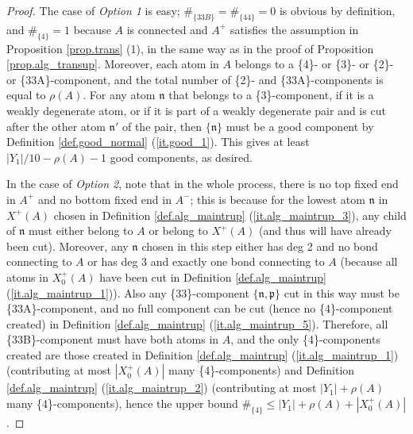 \documentclass[10pt, reqno]{amsart}
\newcommand{\pf}{\mathfrak p}
\newcommand{\nf}{\mathfrak n}
\theoremstyle{definition}
\theoremstyle{remark}
\numberwithin{equation}{section}
\begin{document}
\begin{proof} The case of \emph{Option 1} is easy; $\#_{\{33B\}}=\#_{\{44\}}=0$ is obvious by definition, and $\#_{\{4\}}=1$ because $A$ is connected and $A^+$ satisfies the assumption in Proposition \ref{prop.trans} (1), in the same way as in the proof of Proposition \ref{prop.alg_transup}. Moreover, each atom in $A$ belongs to a \{4\}- or \{3\}- or \{2\}- or \{33A\}-component, and the total number of \{2\}- and \{33A\}-components is equal to $\rho(A)$. For any atom $\nf$ that belongs to a  \{3\}-component, if it is a weakly degenerate atom, or if it is part of a weakly degenerate pair and is cut after the other atom $\nf'$ of the pair, then $\{\nf\}$ must be a good component by Definition \ref{def.good_normal} (\ref{it.good_1}). This gives at least $|Y_1|/10-\rho(A)-1$ good components, as desired.

In the case of \emph{Option 2}, note that in the whole process, there is no top fixed end in $A^+$ and no bottom fixed end in $A^-$; this is because for the lowest atom $\nf$ in $X^+(A)$ chosen in Definition \ref{def.alg_maintrup} (\ref{it.alg_maintrup_3}), any child of $\nf$ must either belong to $A$ or belong to $X^+(A)$ (and thus will have already been cut). Moreover, any $\nf$ chosen in this step either has deg 2 and no bond connecting to $A$ or has deg 3 and exactly one bond connecting to $A$ (because all atoms in $X_0^+(A)$ have been cut in Definition \ref{def.alg_maintrup} (\ref{it.alg_maintrup_1})). Also any \{33\}-component $\{\nf,\pf\}$ cut in this way must be \{33A\}-component, and no full component can be cut (hence no \{4\}-component created) in Definition \ref{def.alg_maintrup} (\ref{it.alg_maintrup_5}). Therefore, all \{33B\}-component must have both atoms in $A$, and the only \{4\}-components created are those created in Definition \ref{def.alg_maintrup} (\ref{it.alg_maintrup_1}) (contributing at most $|X_0^+(A)|$ many \{4\}-components) and Definition \ref{def.alg_maintrup} (\ref{it.alg_maintrup_2}) (contributing at most $|Y_1|+\rho(A)$ many \{4\}-components), hence the upper bound $\#_{\{4\}}\leq|Y_1|+\rho(A)+|X_0^+(A)|$.


\end{proof}
\end{document}
